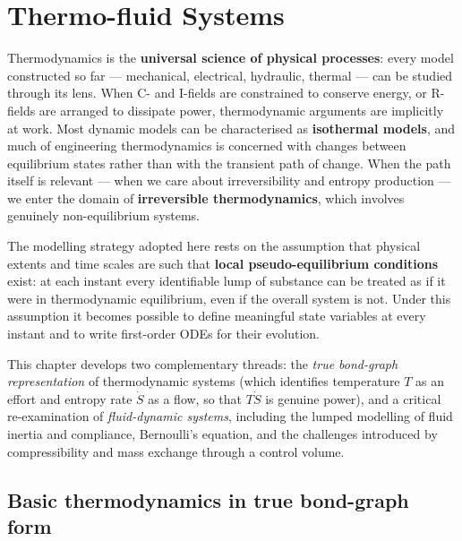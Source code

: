 \chapter{Thermo-fluid Systems}
\label{ch:thermofluid}

Thermodynamics is the \textbf{universal science of physical processes}: every
model constructed so far --- mechanical, electrical, hydraulic, thermal ---
can be studied through its lens.  When C- and I-fields are constrained to
conserve energy, or R-fields are arranged to dissipate power, thermodynamic
arguments are implicitly at work.  Most dynamic models can be characterised
as \textbf{isothermal models}, and much of engineering thermodynamics is
concerned with changes between equilibrium states rather than with the
transient path of change.  When the path itself is relevant --- when we care
about irreversibility and entropy production --- we enter the domain of
\textbf{irreversible thermodynamics}, which involves genuinely non-equilibrium
systems.

The modelling strategy adopted here rests on the assumption that physical
extents and time scales are such that \textbf{local pseudo-equilibrium
conditions} exist: at each instant every identifiable lump of substance can
be treated as if it were in thermodynamic equilibrium, even if the overall
system is not.  Under this assumption it becomes possible to define
meaningful state variables at every instant and to write first-order ODEs for
their evolution.

This chapter develops two complementary threads: the \emph{true bond-graph
representation} of thermodynamic systems (which identifies temperature $T$ as
an effort and entropy rate $\dot{S}$ as a flow, so that $T\dot{S}$ is genuine
power), and a critical re-examination of \emph{fluid-dynamic systems},
including the lumped modelling of fluid inertia and compliance, Bernoulli's
equation, and the challenges introduced by compressibility and mass exchange
through a control volume.

\section{Basic thermodynamics in true bond-graph form}
\label{sec:true_bg_thermo}

